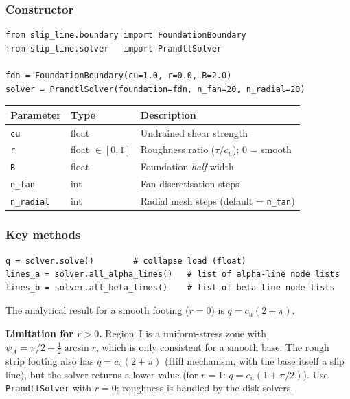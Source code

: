 \documentclass[11pt,a4paper]{article}
\begin{document}
\subsubsection*{Constructor}

\begin{lstlisting}
from slip_line.boundary import FoundationBoundary
from slip_line.solver   import PrandtlSolver

fdn = FoundationBoundary(cu=1.0, r=0.0, B=2.0)
solver = PrandtlSolver(foundation=fdn, n_fan=20, n_radial=20)
\end{lstlisting}

\begin{center}
\begin{tabular}{lll}
\toprule
Parameter & Type & Description \\
\midrule
\texttt{cu} & float & Undrained shear strength \\
\texttt{r} & float $\in[0,1]$ & Roughness ratio ($\tau/c_u$); $0$ = smooth \\
\texttt{B} & float & Foundation \emph{half}-width \\
\texttt{n\_fan} & int & Fan discretisation steps \\
\texttt{n\_radial} & int & Radial mesh steps (default = \texttt{n\_fan}) \\
\bottomrule
\end{tabular}
\end{center}

\subsubsection*{Key methods}

\begin{lstlisting}
q = solver.solve()        # collapse load (float)
lines_a = solver.all_alpha_lines()   # list of alpha-line node lists
lines_b = solver.all_beta_lines()    # list of beta-line node lists
\end{lstlisting}

The analytical result for a smooth footing ($r=0$) is $q = c_u(2+\pi)$.

\textbf{Limitation for $r > 0$.}  Region~I is a uniform-stress zone
with $\psi_A = \pi/2 - \tfrac12\arcsin r$, which is only consistent for
a smooth base.  The rough strip footing also has $q = c_u(2+\pi)$
(Hill mechanism, with the base itself a slip line), but the solver
returns a lower value (for $r = 1$: $q = c_u(1+\pi/2)$).  Use
\texttt{PrandtlSolver} with $r = 0$; roughness is handled by the disk
solvers.
\end{document}
